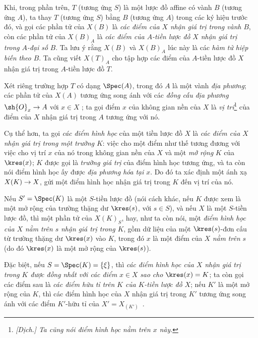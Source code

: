 \documentclass[oneside]{amsart}
\makeatletter
\newcommand{\ega@arrow}[2]{\mathchoice{#1}{#2}{#2}{#2}}
\renewcommand{\to}{\ega@arrow{\longrightarrow}{\rightarrow}}
\newcommand{\oldpage}[2][]{{\marginnote{\normalfont\textbf{#1}~|~#2}}\ignorespaces}
\let\EGAOriginalLabel\label
\renewcommand{\label}[1]{\phantomsection\EGAOriginalLabel{#1}}
\makeatother
\begin{document}
\begin{env}[3.4.4]
\label{I.3.4.4}
Khi, trong phần trên, $T$ (tương ứng $S$) là một lược đồ affine có vành $B$
(tương ứng $A$), ta thay $T$ (tương ứng $S$) bằng $B$ (tương ứng $A$) trong
các ký hiệu trước đó, và gọi các phần tử của $X(B)$ là \emph{các điểm của $X$
nhận giá trị trong vành $B$}, còn các phần tử của $X(B)_A$ là \emph{các điểm
của $A$-tiền lược đồ $X$ nhận giá trị trong $A$-đại số $B$}. Ta lưu ý rằng
$X(B)$ và $X(B)_A$ lúc này là các \emph{hàm tử hiệp biến theo $B$}. Ta cũng
viết $X(T)_A$ cho tập hợp các điểm của $A$-tiền lược đồ $X$ nhận giá trị
trong $A$-tiền lược đồ $T$.
\end{env}

\begin{env}[3.4.5]
\label{I.3.4.5}
Xét riêng trường hợp $T$ có dạng $\Spec(A)$, trong đó $A$ là một vành
\emph{địa phương}; các phần tử của $X(A)$ tương ứng song ánh với các
\emph{đồng cấu địa phương} $\sh{O}_x\to A$ với $x\in X$ ; ta
gọi điểm $x$ của không gian nền của $X$ là \emph{vị trí}\footnote{\emph{[Dịch.]
Ta cũng nói điểm hình học nằm trên $x$ này.}} của điểm của $X$ nhận giá trị
trong $A$ tương ứng với nó.

Cụ thể hơn, ta gọi \emph{các điểm hình học} của một tiền lược đồ $X$ là
\emph{các điểm của $X$ nhận giá trị trong một trường $K$}: việc cho một điểm
như thế tương đương với việc cho
\oldpage[I]{113}
vị trí $x$ của nó trong không gian nền của $X$ và một \emph{mở rộng} $K$ của
$\kres(x)$; $K$ được gọi là \emph{trường giá trị} của điểm hình học tương ứng,
và ta còn nói điểm hình học ấy được \emph{địa phương hóa tại $x$}. Do đó ta
xác định một ánh xạ $X(K)\to X$, gửi một điểm hình học nhận giá trị trong $K$
đến vị trí của nó.

Nếu $S'=\Spec(K)$ là một $S$-tiền lược đồ (nói cách khác, nếu $K$ được xem là
một mở rộng của trường thặng dư $\kres(s)$, với $s\in S$), và nếu $X$ là một
$S$-tiền lược đồ, thì một phần tử của $X(K)_S$, hay, như ta còn nói, một
\emph{điểm hình học của $X$ nằm trên $s$ nhận giá trị trong $K$}, gồm dữ liệu
của một $\kres(s)$-đơn cấu từ trường thặng dư $\kres(x)$ vào $K$, trong đó $x$
là một điểm của $X$ \emph{nằm trên $s$} (do đó $\kres(x)$ là một mở rộng của
$\kres(s)$).

Đặc biệt, nếu $S=\Spec(K)=\{\xi\}$, thì \emph{các điểm hình học của $X$ nhận
giá trị trong $K$ được đồng nhất với các điểm $x\in X$ sao cho $\kres(x)=K$};
ta còn gọi các điểm sau là \emph{các điểm hữu tỉ trên $K$ của $K$-tiền lược
đồ $X$}; nếu $K'$ là một mở rộng của $K$, thì các điểm hình học của $X$ nhận
giá trị trong $K'$ tương ứng song ánh với các điểm $K'$-hữu tỉ của
$X'=X_{(K')}$~.
\end{env}
\end{document}
